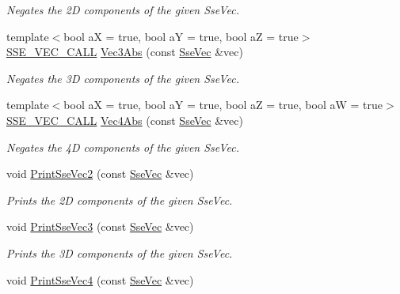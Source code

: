 \begin{DoxyCompactItemize}
\begin{DoxyCompactList}\small\item\em Negates the 2\+D components of the given Sse\+Vec. \end{DoxyCompactList}\item 
{\footnotesize template$<$bool a\+X = true, bool a\+Y = true, bool a\+Z = true$>$ }\\\hyperlink{ssevec__math__defs_8h_a97454f977a5281455cecacce1e8ba670}{S\+S\+E\+\_\+\+V\+E\+C\+\_\+\+C\+A\+L\+L} \hyperlink{group___s_i_m_d_vec_math_gabf51927fbe1bfdca633d048af832c95b}{Vec3\+Abs} (const \hyperlink{namespacegofxmath_a634570ddcd2496053ee966227080e02f}{Sse\+Vec} \&vec)
\begin{DoxyCompactList}\small\item\em Negates the 3\+D components of the given Sse\+Vec. \end{DoxyCompactList}\item 
{\footnotesize template$<$bool a\+X = true, bool a\+Y = true, bool a\+Z = true, bool a\+W = true$>$ }\\\hyperlink{ssevec__math__defs_8h_a97454f977a5281455cecacce1e8ba670}{S\+S\+E\+\_\+\+V\+E\+C\+\_\+\+C\+A\+L\+L} \hyperlink{group___s_i_m_d_vec_math_gad56f44d523b3a19103850d4bdb84c940}{Vec4\+Abs} (const \hyperlink{namespacegofxmath_a634570ddcd2496053ee966227080e02f}{Sse\+Vec} \&vec)
\begin{DoxyCompactList}\small\item\em Negates the 4\+D components of the given Sse\+Vec. \end{DoxyCompactList}\item 
void \hyperlink{group___s_i_m_d_vec_math_ga78f12d2d1d6c49fb87351f8826b80c00}{Print\+Sse\+Vec2} (const \hyperlink{namespacegofxmath_a634570ddcd2496053ee966227080e02f}{Sse\+Vec} \&vec)
\begin{DoxyCompactList}\small\item\em Prints the 2\+D components of the given Sse\+Vec. \end{DoxyCompactList}\item 
void \hyperlink{group___s_i_m_d_vec_math_ga1b2fce92fe923cebc413a666a5f3d006}{Print\+Sse\+Vec3} (const \hyperlink{namespacegofxmath_a634570ddcd2496053ee966227080e02f}{Sse\+Vec} \&vec)
\begin{DoxyCompactList}\small\item\em Prints the 3\+D components of the given Sse\+Vec. \end{DoxyCompactList}\item 
void \hyperlink{group___s_i_m_d_vec_math_ga699fd6ca653661bdefc07e5502fc680a}{Print\+Sse\+Vec4} (const \hyperlink{namespacegofxmath_a634570ddcd2496053ee966227080e02f}{Sse\+Vec} \&vec)

\end{DoxyCompactItemize}
